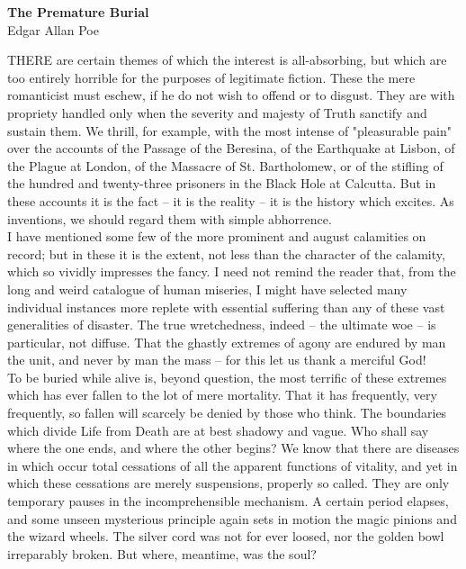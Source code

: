 \documentclass[12pt,a4paper]{article}
\begin{document}
\begin{center}
\begin{Large}
\textbf{The Premature Burial} \\ \bigskip
{Edgar Allan Poe} \linebreak \\ 

\end{Large}
\end{center}

THERE are certain themes of which the interest is all-absorbing, but which are too entirely horrible for the purposes of legitimate fiction. These the mere romanticist must eschew, if he do not wish to offend or to disgust. They are with propriety handled only when the severity and majesty of Truth sanctify and sustain them. We thrill, for example, with the most intense of "pleasurable pain" over the accounts of the Passage of the Beresina, of the Earthquake at Lisbon, of the Plague at London, of the Massacre of St. Bartholomew, or of the stifling of the hundred and twenty-three prisoners in the Black Hole at Calcutta. But in these accounts it is the fact -- it is the reality -- it is the history which excites. As inventions, we should regard them with simple abhorrence. \\

I have mentioned some few of the more prominent and august calamities on record; but in these it is the extent, not less than the character of the calamity, which so vividly impresses the fancy. I need not remind the reader that, from the long and weird catalogue of human miseries, I might have selected many individual instances more replete with essential suffering than any of these vast generalities of disaster. The true wretchedness, indeed -- the ultimate woe -- is particular, not diffuse. That the ghastly extremes of agony are endured by man the unit, and never by man the mass -- for this let us thank a merciful God! \\

To be buried while alive is, beyond question, the most terrific of these extremes which has ever fallen to the lot of mere mortality. That it has frequently, very frequently, so fallen will scarcely be denied by those who think. The boundaries which divide Life from Death are at best shadowy and vague. Who shall say where the one ends, and where the other begins? We know that there are diseases in which occur total cessations of all the apparent functions of vitality, and yet in which these cessations are merely suspensions, properly so called. They are only temporary pauses in the incomprehensible mechanism. A certain period elapses, and some unseen mysterious principle again sets in motion the magic pinions and the wizard wheels. The silver cord was not for ever loosed, nor the golden bowl irreparably broken. But where, meantime, was the soul? \\
\end{document}
